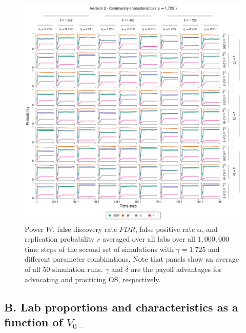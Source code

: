 \documentclass[meta, authordate]{jote-new-article}
\begin{document}
\begin{figure}
  \begin{fullwidth}
    \centering
    \includegraphics[width=\textwidth]{v2_cha_plot_sens_payypro1.725.png}
    \caption{Power $W$, false discovery rate $FDR$, false positive rate $\alpha$, and replication probability $r$ averaged over all labs over all $1,000,000$ time steps of the second set of simulations with $\gamma=1.725$ and different parameter combinations. Note that panels show an average of all $50$ simulation runs. $\gamma$ and $\delta$ are the payoff advantages for advocating and practicing OS, respectively.}
    \label{fig:v2_cha_plot_sens_payypro1.725}
  \end{fullwidth}
\end{figure}
%

\clearpage
\subsection{B. Lab proportions and characteristics as a function of $V_{0-}$}\label{sec:appendix_b}
\end{document}
